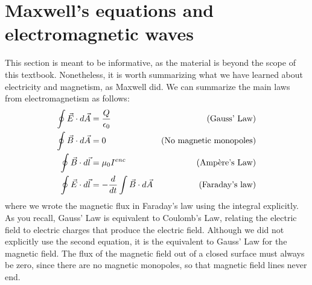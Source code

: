 \section{Maxwell's equations and electromagnetic waves}
This section is meant to be informative, as the material is beyond the scope of this textbook. Nonetheless, it is worth summarizing what we have learned about electricity and magnetism, as Maxwell did. We can summarize the main laws from electromagnetism as follows:
\begin{align*}
\oint \vec E\cdot d\vec A &= \frac{Q}{\epsilon_0}&\text{(Gauss' Law)}\\
\oint \vec B\cdot d\vec A &= 0 &\text{(No magnetic monopoles)}\\
\oint \vec B\cdot d\vec l &= \mu_0 I^{enc} &\text{(\ampere's Law)}\\
\oint \vec E\cdot d\vec l &= -\frac{d}{dt}\int \vec B\cdot d\vec A  &\text{(Faraday's law)}\\
\end{align*}
where we wrote the magnetic flux in Faraday's law using the integral explicitly. As you recall, Gauss' Law is equivalent to Coulomb's Law, relating the electric field to electric charges that produce the electric field. Although we did not explicitly use the second equation, it is the equivalent to Gauss' Law for the magnetic field. The flux of the magnetic field out of a closed surface must always be zero, since there are no magnetic monopoles, so that magnetic field lines never end.

